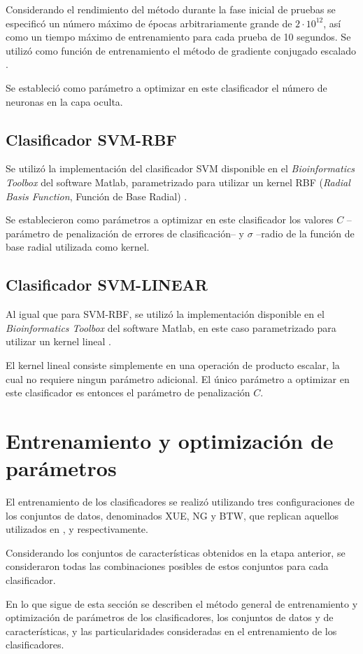 \documentclass[12pt,bibliography=oldstyle,DIV=12,parskip=half-,titlepage]{scrartcl}
\begin{document}
Considerando el rendimiento del método durante la fase inicial de
pruebas se especificó un número máximo de épocas arbitrariamente
grande de $2\cdot10^{12}$, así como un tiempo máximo de entrenamiento
para cada prueba de 10 segundos. Se utilizó como función de
entrenamiento el método de gradiente conjugado escalado
\cite{moeller}.

Se estableció como parámetro a optimizar en este clasificador el
número de neuronas en la capa oculta.
%
\subsection{Clasificador SVM-RBF}
Se utilizó la implementación del clasificador SVM disponible en el
\emph{Bioinformatics Toolbox} del software Matlab, parametrizado para
utilizar un kernel RBF (\emph{Radial Basis Function}, Función de Base
Radial) \cite{svm}.

Se establecieron como parámetros a optimizar en este clasificador los
valores $C$ --parámetro de penalización de errores de clasificación--
y $\sigma$ --radio de la función de base radial utilizada como kernel.
%
\subsection{Clasificador SVM-LINEAR}
Al igual que para SVM-RBF, se utilizó la implementación disponible en
el \emph{Bioinformatics Toolbox} del software Matlab, en este caso
parametrizado para utilizar un kernel lineal \cite{svm}.

El kernel lineal consiste simplemente en una operación de producto
escalar, la cual no requiere ningun parámetro adicional. El único
parámetro a optimizar en este clasificador es entonces el parámetro de
penalización $C$.
%
\section{Entrenamiento y optimización de parámetros}
El entrenamiento de los clasificadores se realizó utilizando tres
configuraciones de los conjuntos de datos, denominados XUE, NG y BTW, que replican aquellos
utilizados en \cite{xue}, \cite{ng} y \cite{batuwita} respectivamente.

Considerando los conjuntos de características obtenidos en la etapa
anterior, se consideraron todas las combinaciones posibles de estos
conjuntos para cada clasificador.

En lo que sigue de esta sección se describen el método general de
entrenamiento y optimización de parámetros de los clasificadores, los
conjuntos de datos y de características, y las particularidades
consideradas en el entrenamiento de los clasificadores.
%
\end{document}
